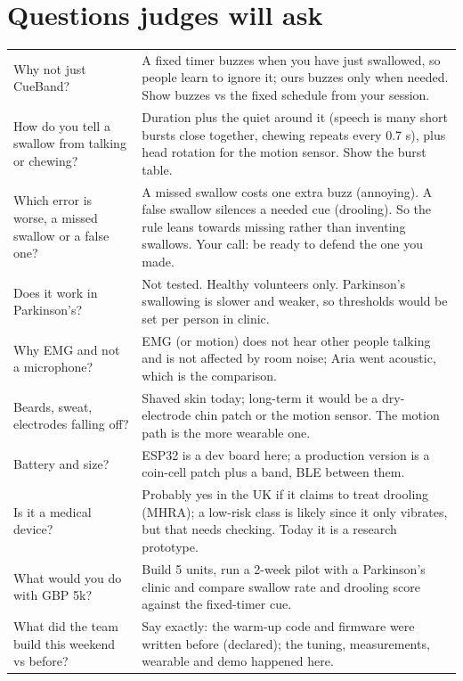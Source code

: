 \documentclass[10.5pt,a4paper]{article}
\begin{document}
\section{Questions judges will ask}
\begin{tabularx}{\linewidth}{@{}p{5.2cm}L@{}}
\toprule
Why not just CueBand? & A fixed timer buzzes when you have just swallowed, so people learn to ignore it; ours buzzes only when needed. Show buzzes vs the fixed schedule from your session.\\
How do you tell a swallow from talking or chewing? & Duration plus the quiet around it (speech is many short bursts close together, chewing repeats every 0.7 s), plus head rotation for the motion sensor. Show the burst table.\\
Which error is worse, a missed swallow or a false one? & A missed swallow costs one extra buzz (annoying). A false swallow silences a needed cue (drooling). So the rule leans towards missing rather than inventing swallows. Your call: be ready to defend the one you made.\\
Does it work in Parkinson's? & Not tested. Healthy volunteers only. Parkinson's swallowing is slower and weaker, so thresholds would be set per person in clinic.\\
Why EMG and not a microphone? & EMG (or motion) does not hear other people talking and is not affected by room noise; Aria went acoustic, which is the comparison.\\
Beards, sweat, electrodes falling off? & Shaved skin today; long-term it would be a dry-electrode chin patch or the motion sensor. The motion path is the more wearable one.\\
Battery and size? & ESP32 is a dev board here; a production version is a coin-cell patch plus a band, BLE between them.\\
Is it a medical device? & Probably yes in the UK if it claims to treat drooling (MHRA); a low-risk class is likely since it only vibrates, but that needs checking. Today it is a research prototype.\\
What would you do with GBP 5k? & Build 5 units, run a 2-week pilot with a Parkinson's clinic and compare swallow rate and drooling score against the fixed-timer cue.\\
What did the team build this weekend vs before? & Say exactly: the warm-up code and firmware were written before (declared); the tuning, measurements, wearable and demo happened here.\\
\bottomrule
\end{tabularx}
\end{document}
